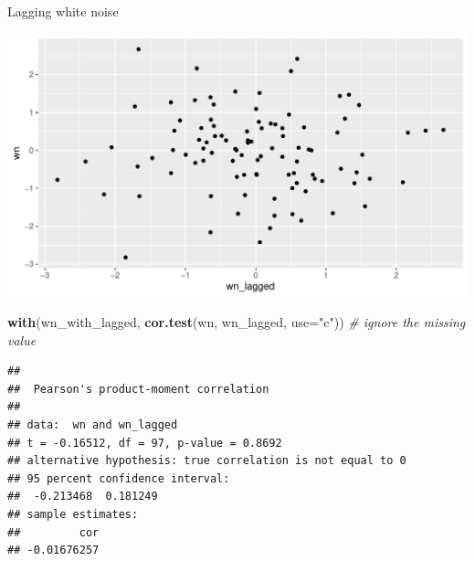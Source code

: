 \documentclass[ignorenonframetext,]{beamer}
\newenvironment{Shaded}{\begin{snugshade}}{\end{snugshade}}
\newcommand{\CommentTok}[1]{\textcolor[rgb]{0.56,0.35,0.01}{\textit{#1}}}
\newcommand{\DataTypeTok}[1]{\textcolor[rgb]{0.13,0.29,0.53}{#1}}
\newcommand{\KeywordTok}[1]{\textcolor[rgb]{0.13,0.29,0.53}{\textbf{#1}}}
\newcommand{\NormalTok}[1]{#1}
\newcommand{\OperatorTok}[1]{\textcolor[rgb]{0.81,0.36,0.00}{\textbf{#1}}}
\newcommand{\StringTok}[1]{\textcolor[rgb]{0.31,0.60,0.02}{#1}}
\begin{document}
\begin{frame}[fragile]{Lagging white noise}
\protect\hypertarget{lagging-white-noise}{}

\begin{Shaded}
\end{Shaded}

\includegraphics{figure/unnamed-chunk-581-1.pdf}

\begin{Shaded}
\begin{Highlighting}[]
\KeywordTok{with}\NormalTok{(wn_with_lagged, }\KeywordTok{cor.test}\NormalTok{(wn, wn_lagged, }\DataTypeTok{use=}\StringTok{"c"}\NormalTok{)) }\CommentTok{# ignore the missing value}
\end{Highlighting}
\end{Shaded}

\begin{verbatim}
## 
##  Pearson's product-moment correlation
## 
## data:  wn and wn_lagged
## t = -0.16512, df = 97, p-value = 0.8692
## alternative hypothesis: true correlation is not equal to 0
## 95 percent confidence interval:
##  -0.213468  0.181249
## sample estimates:
##         cor 
## -0.01676257
\end{verbatim}

\end{frame}
\end{document}
